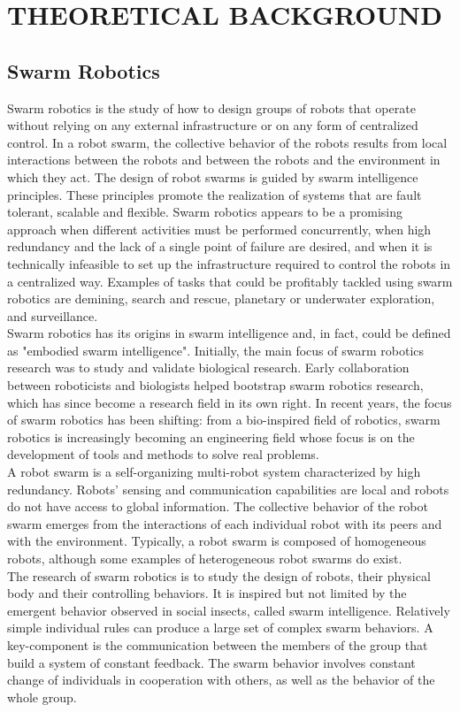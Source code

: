 \section{THEORETICAL BACKGROUND}
\subsection{Swarm Robotics}
Swarm robotics is the study of how to design groups of robots that operate without relying on any external infrastructure or on any form of centralized control. In a robot swarm, the collective behavior of the robots results from local interactions between the robots and between the robots and the environment in which they act. The design of robot swarms is guided by swarm intelligence principles. These principles promote the realization of systems that are fault tolerant, scalable and flexible. Swarm robotics appears to be a promising approach when different activities must be performed concurrently, when high redundancy and the lack of a single point of failure are desired, and when it is technically infeasible to set up the infrastructure required to control the robots in a centralized way. Examples of tasks that could be profitably tackled using swarm robotics are demining, search and rescue, planetary or underwater exploration, and surveillance.\\
Swarm robotics has its origins in swarm intelligence and, in fact, could be defined as "embodied swarm intelligence". Initially, the main focus of swarm robotics research was to study and validate biological research. Early collaboration between roboticists and biologists helped bootstrap swarm robotics research, which has since become a research field in its own right. In recent years, the focus of swarm robotics has been shifting: from a bio-inspired field of robotics, swarm robotics is increasingly becoming an engineering field whose focus is on the development of tools and methods to solve real problems.\\
A robot swarm is a self-organizing multi-robot system characterized by high redundancy. Robots’ sensing and communication capabilities are local and robots do not have access to global information. The collective behavior of the robot swarm emerges from the interactions of each individual robot with its peers and with the environment. Typically, a robot swarm is composed of homogeneous robots, although some examples of heterogeneous robot swarms do exist.\\ 
The research of swarm robotics is to study the design of robots, their physical body and their controlling behaviors. It is inspired but not limited by the emergent behavior observed in social insects, called swarm intelligence. Relatively simple individual rules can produce a large set of complex swarm behaviors. A key-component is the communication between the members of the group that build a system of constant feedback. The swarm behavior involves constant change of individuals in cooperation with others, as well as the behavior of the whole group.\\
